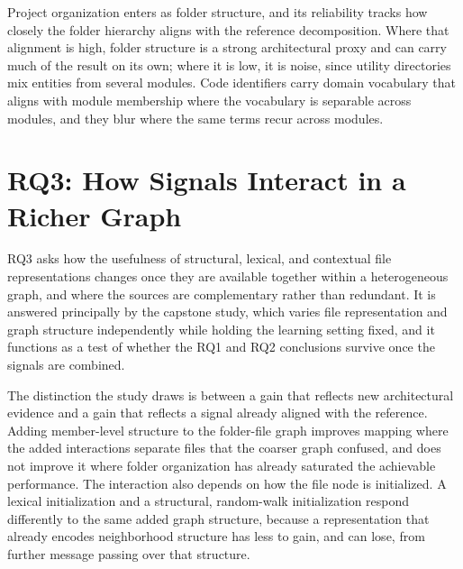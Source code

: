 Project organization enters as folder structure, and its reliability tracks how closely the folder hierarchy aligns with the reference decomposition. Where that alignment is high, folder structure is a strong architectural proxy and can carry much of the result on its own; where it is low, it is noise, since utility directories mix entities from several modules. %
Code identifiers carry domain vocabulary that aligns with module membership where the vocabulary is separable across modules, and they blur where the same terms recur across modules. %
 
\section{RQ3: How Signals Interact in a Richer Graph}
\label{sec:syn-rq3}
 
RQ3 asks how the usefulness of structural, lexical, and contextual file representations changes once they are available together within a heterogeneous graph, and where the sources are complementary rather than redundant. It is answered principally by the capstone study, which varies file representation and graph structure independently while holding the learning setting fixed, and it functions as a test of whether the RQ1 and RQ2 conclusions survive once the signals are combined.
 
The distinction the study draws is between a gain that reflects new architectural evidence and a gain that reflects a signal already aligned with the reference. Adding member-level structure to the folder-file graph improves mapping where the added interactions separate files that the coarser graph confused, and does not improve it where folder organization has already saturated the achievable performance. %
The interaction also depends on how the file node is initialized. A lexical initialization and a structural, random-walk initialization respond differently to the same added graph structure, because a representation that already encodes neighborhood structure has less to gain, and can lose, from further message passing over that structure. %
 

